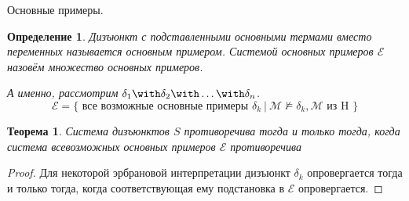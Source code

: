 \documentclass[aspectratio=169]{beamer}
\newtheorem{thm}{Теорема}[section]
\newtheorem{dfn}{Определение}[section]
\newtheorem{exm}{Пример}[section]
\begin{document}
\begin{frame}{Основные примеры.}
\begin{dfn}
Дизъюнкт с подставленными основными термами вместо переменных называется основным примером.
Системой основных примеров $\mathcal{E}$ назовём множество основных примеров.

А именно, рассмотрим $\delta_1\with\delta_2\with\dots\with\delta_n$. 
$$\mathcal{E} = \{ \text{ все возможные основные примеры }\delta_k\ |\ \mathcal{M} \not\models \delta_k, \mathcal{M}\text{ из H }\}$$
\end{dfn}\vspace{-0.5cm}
\begin{thm}Система дизъюнктов $S$ противоречива тогда и только тогда, когда система всевозможных
основных примеров $\mathcal{E}$ противоречива\end{thm}
\begin{proof}Для некоторой эрбрановой интерпретации дизъюнкт $\delta_k$
опровергается тогда и только тогда, когда соответствующая ему подстановка в $\mathcal{E}$ опровергается.
\end{proof}\end{frame}

\begin{comment}
\begin{frame}{Компактность}
\begin{dfn} 
Пространство $X$ компактно, если из любого его открытого покрытия $U$ можно выделить конечное подпокрытие:

$X = \cup U$, существует $V \subseteq U$, что $|V| < \aleph_0$ и $X = \cup V$.
\end{dfn}

\begin{exm}
$(0,1)$ не компактен. Например, $U = \{(\varepsilon/2,\varepsilon)\ |\ \varepsilon\in(0,1)\}$.
Пусть $V \subset U$ и $|V| < \aleph_0$. Тогда $\min \{ a\ |\ (a,b) \in V \} > 0$.
\end{exm}

\begin{exm}
$[0,1]$ компактен. Выберем $U$ и покажем, что в нём есть подпокрытие.
Рассмотрим все подотрезки вида $[a,x]$ где $a < x$, имеющие конечное покрытие.
Несложно показать, что $\max x = 1$.
\end{exm}
\end{frame}
\end{comment}
\end{document}
